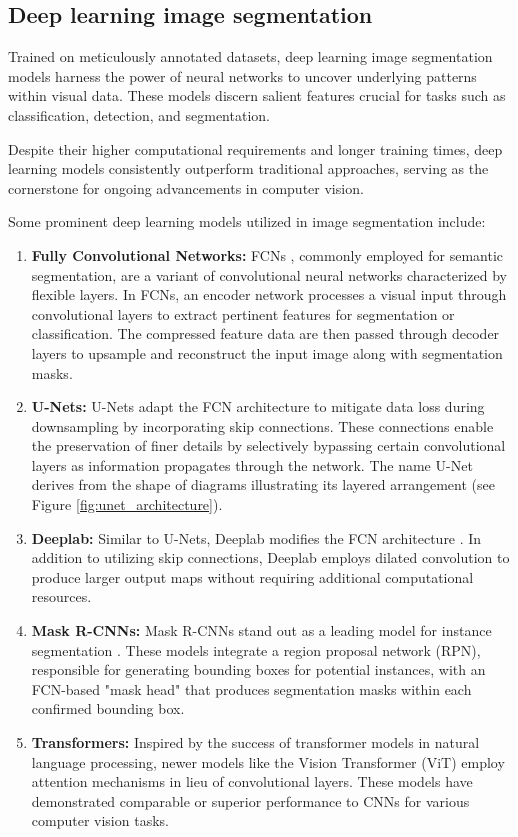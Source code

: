 \subsection{Deep learning image segmentation}
Trained on meticulously annotated datasets, deep learning image segmentation models harness the power of neural networks to uncover underlying patterns within visual data. These models discern salient features crucial for tasks such as classification, detection, and segmentation.

Despite their higher computational requirements and longer training times, deep learning models consistently outperform traditional approaches, serving as the cornerstone for ongoing advancements in computer vision.

Some prominent deep learning models utilized in image segmentation include:

\begin{enumerate}
  \item \textbf{Fully Convolutional Networks:} FCNs \cite{FCNLong2015}, commonly employed for semantic segmentation, are a
  variant
  of
  convolutional neural networks characterized by flexible layers. In FCNs, an encoder network processes a visual input
  through convolutional layers to extract pertinent features for segmentation or classification. The compressed
  feature data are then passed through decoder layers to upsample and reconstruct the input image along with
  segmentation masks.
  \item \textbf{U-Nets:} U-Nets \cite{ronneberger2015unet} adapt the FCN architecture to mitigate data loss during downsampling by
  incorporating skip connections. These connections enable the preservation of finer details by selectively bypassing
  certain convolutional layers as information propagates through the network. The name U-Net derives from the shape 
  of diagrams illustrating its layered arrangement (see Figure \ref{fig:unet_architecture}).
  \item \textbf{Deeplab:} Similar to U-Nets, Deeplab modifies the FCN architecture \cite{Deeplab2018}. In addition to utilizing skip
  connections, Deeplab employs dilated convolution to produce larger output maps without requiring additional computational resources.
  \item \textbf{Mask R-CNNs:} Mask R-CNNs stand out as a leading model for instance segmentation \cite{MaskRCNN2017}. These models
  integrate a region proposal network (RPN), responsible for generating bounding boxes for potential instances, with an FCN-based "mask head" that produces segmentation masks within each confirmed bounding box.
  \item \textbf{Transformers:} Inspired by the success of transformer models \cite{vaswani2023attention} in natural language processing,
  newer models like the Vision Transformer (ViT) employ attention mechanisms in lieu of convolutional layers. These models have demonstrated comparable or superior performance to CNNs for various computer vision tasks.
\end{enumerate}

